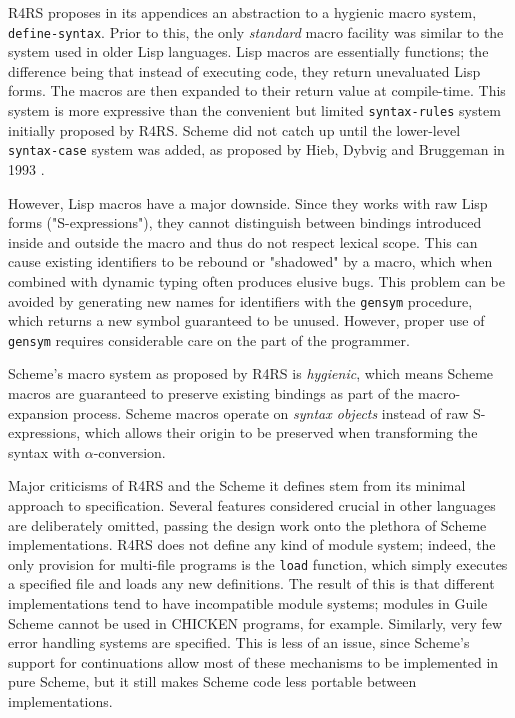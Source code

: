 \documentclass[11pt]{article}
\begin{document}
R4RS proposes in its appendices an abstraction to a hygienic macro system, \texttt{define-syntax}. Prior to this, the only \emph{standard} macro facility was similar to the system used in older Lisp languages. Lisp macros are essentially functions; the difference being that instead of executing code, they return unevaluated Lisp forms. The macros are then expanded to their return value at compile-time. This system is more expressive than the convenient but limited \texttt{syntax-rules} system initially proposed by R4RS. Scheme did not catch up until the lower-level \texttt{syntax-case} system was added, as proposed by Hieb, Dybvig and Bruggeman in 1993 \cite{dybvig1993syntactic}. 

However, Lisp macros have a major downside. Since they works with raw Lisp forms ("S-expressions"), they cannot distinguish between bindings introduced inside and outside the macro and thus do not respect lexical scope. This can cause existing identifiers to be rebound or "shadowed" by a macro, which when combined with dynamic typing often produces elusive bugs. This problem can be avoided by generating new names for identifiers with the \texttt{gensym} procedure, which returns a new symbol guaranteed to be unused. However, proper use of \texttt{gensym} requires considerable care on the part of the programmer. 

Scheme's macro system as proposed by R4RS is \emph{hygienic}, which means Scheme macros are guaranteed to preserve existing bindings as part of the macro-expansion process. Scheme macros operate on \emph{syntax objects} instead of raw S-expressions, which allows their origin to be preserved when transforming the syntax with \(\alpha\)-conversion.

Major criticisms of R4RS and the Scheme it defines stem from its minimal approach to specification. Several features considered crucial in other languages are deliberately omitted, passing the design work onto the plethora of Scheme implementations. R4RS does not define any kind of module system; indeed, the only provision for multi-file programs is the \texttt{load} function, which simply executes a specified file and loads any new definitions. The result of this is that different implementations tend to have incompatible module systems; modules in Guile Scheme cannot be used in CHICKEN programs, for example. Similarly, very few error handling systems are specified. This is less of an issue, since Scheme's support for continuations allow most of these mechanisms to be implemented in pure Scheme, but it still makes Scheme code less portable between implementations.
\end{document}
